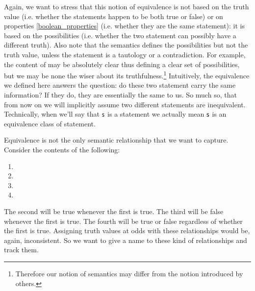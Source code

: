 \documentclass[11pt,letterpaper,fleqn]{memoir} %
\begin{document}
Again, we want to stress that this notion of equivalence is not based on the truth value (i.e. whether the statements happen to be both true or false) or on properties \ref{boolean_properties} (i.e. whether they are the same statement): it is based on the possibilities (i.e. whether the two statement can possibly have a different truth). Also note that the semantics defines the possibilities but not the truth value, unless the statement is a tautology or a contradiction. For example, the content of  may be absolutely clear thus defining a clear set of possibilities, but we may be none the wiser about its truthfulness.\footnote{Therefore our notion of semantics may differ from the notion introduced by others.} Intuitively, the equivalence we defined here answers the question: do these two statement carry the same information? If they do, they are essentially the same to us. So much so, that from now on we will implicitly assume two different statements are inequivalent. Technically, when we'll say that $\mathsf{s}$ is a statement we actually mean $\mathsf{s}$ is an equivalence class of statement.

Equivalence is not the only semantic relationship that we want to capture. Consider the contents of the following:
\begin{enumerate}
	\item {}
	\item {}
	\item {}
	\item {}
\end{enumerate}
The second will be true whenever the first is true. The third will be false whenever the first is true. The fourth will be true or false regardless of whether the first is true. Assigning truth values at odds with these relationships would be, again, inconsistent. So we want to give a name to these kind of relationships and track them.
\end{document}
